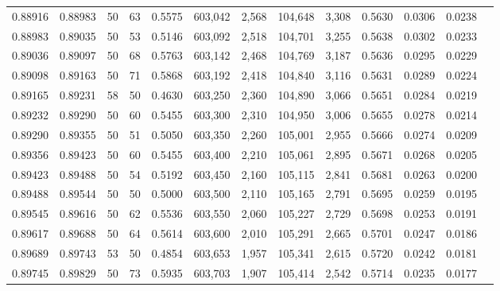 \begin{tabular}{rrrrrrrrrrrrr}
0.88916 & 0.88983 &    50 &  63 &                                     0.5575 & 603,042 &   2,568 & 104,648 &   3,308 & 0.5630 & 0.0306 & 0.0238 \\
0.88983 & 0.89035 &    50 &  53 &                                     0.5146 & 603,092 &   2,518 & 104,701 &   3,255 & 0.5638 & 0.0302 & 0.0233 \\
0.89036 & 0.89097 &    50 &  68 &                                     0.5763 & 603,142 &   2,468 & 104,769 &   3,187 & 0.5636 & 0.0295 & 0.0229 \\
0.89098 & 0.89163 &    50 &  71 &                                     0.5868 & 603,192 &   2,418 & 104,840 &   3,116 & 0.5631 & 0.0289 & 0.0224 \\
0.89165 & 0.89231 &    58 &  50 &                                     0.4630 & 603,250 &   2,360 & 104,890 &   3,066 & 0.5651 & 0.0284 & 0.0219 \\
0.89232 & 0.89290 &    50 &  60 &                                     0.5455 & 603,300 &   2,310 & 104,950 &   3,006 & 0.5655 & 0.0278 & 0.0214 \\
0.89290 & 0.89355 &    50 &  51 &                                     0.5050 & 603,350 &   2,260 & 105,001 &   2,955 & 0.5666 & 0.0274 & 0.0209 \\
0.89356 & 0.89423 &    50 &  60 &                                     0.5455 & 603,400 &   2,210 & 105,061 &   2,895 & 0.5671 & 0.0268 & 0.0205 \\
0.89423 & 0.89488 &    50 &  54 &                                     0.5192 & 603,450 &   2,160 & 105,115 &   2,841 & 0.5681 & 0.0263 & 0.0200 \\
0.89488 & 0.89544 &    50 &  50 &                                     0.5000 & 603,500 &   2,110 & 105,165 &   2,791 & 0.5695 & 0.0259 & 0.0195 \\
0.89545 & 0.89616 &    50 &  62 &                                     0.5536 & 603,550 &   2,060 & 105,227 &   2,729 & 0.5698 & 0.0253 & 0.0191 \\
0.89617 & 0.89688 &    50 &  64 &                                     0.5614 & 603,600 &   2,010 & 105,291 &   2,665 & 0.5701 & 0.0247 & 0.0186 \\
0.89689 & 0.89743 &    53 &  50 &                                     0.4854 & 603,653 &   1,957 & 105,341 &   2,615 & 0.5720 & 0.0242 & 0.0181 \\
0.89745 & 0.89829 &    50 &  73 &                                     0.5935 & 603,703 &   1,907 & 105,414 &   2,542 & 0.5714 & 0.0235 & 0.0177 \\

\end{tabular}
